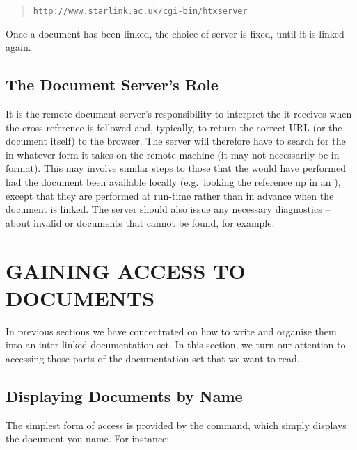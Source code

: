 \begin{quote}
\begin{verbatim}
http://www.starlink.ac.uk/cgi-bin/htxserver
\end{verbatim}
\end{quote}

Once a document has been linked, the choice of server is fixed, until
it is linked again.

\subsection{\label{sect:docserversrole}The Document Server's Role}

It is the remote document server's responsibility to interpret the
 it receives when the cross-reference is followed and,
typically, to return the correct URL (or the document itself) to the
browser.  The server will therefore have to search for the
 in whatever form it takes on the remote machine (it
may not necessarily be in  format).  This may involve
similar steps to those that the   would
have performed had the document been available locally
(\st{e.g.}\ looking the reference up in an ),
except that they are performed at run-time rather than in advance when
the document is linked. The server should also issue any necessary
diagnostics -- about invalid  or documents that cannot
be found, for example.

\section{\label{sect:accessingdocuments}GAINING ACCESS TO DOCUMENTS}

In previous sections we have concentrated on how to write
 and organise
them into an inter-linked documentation set. In this section, we turn
our attention to accessing those parts of the documentation set that
we want to read.

\subsection{\label{sect:accessingbyname}Displaying Documents by Name}

The simplest form of 
access is provided by the  command, which
simply displays the document you name. For instance:

